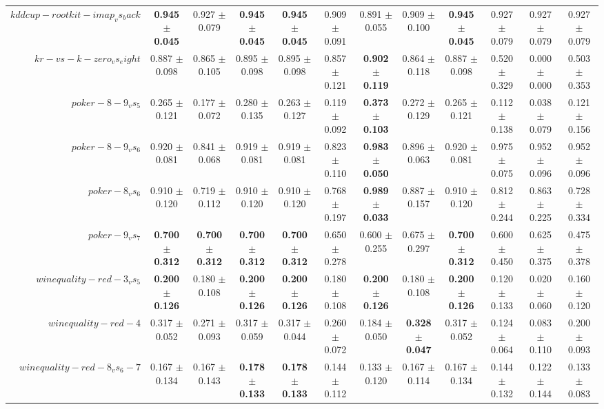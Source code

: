 \begin{table}[!ht]
{\begin{tabular}{r c c c c c c c c c c c}
$kddcup-rootkit-imap_vs_back$ & \textbf{0.945 $\pm$ 0.045} & 0.927 $\pm$ 0.079 & \textbf{0.945 $\pm$ 0.045} & \textbf{0.945 $\pm$ 0.045} & 0.909 $\pm$ 0.091 & 0.891 $\pm$ 0.055 & 0.909 $\pm$ 0.100 & \textbf{0.945 $\pm$ 0.045} & 0.927 $\pm$ 0.079 & 0.927 $\pm$ 0.079 & 0.927 $\pm$ 0.079 \\
$kr-vs-k-zero_vs_eight$ & 0.887 $\pm$ 0.098 & 0.865 $\pm$ 0.105 & 0.895 $\pm$ 0.098 & 0.895 $\pm$ 0.098 & 0.857 $\pm$ 0.121 & \textbf{0.902 $\pm$ 0.119} & 0.864 $\pm$ 0.118 & 0.887 $\pm$ 0.098 & 0.520 $\pm$ 0.329 & 0.000 $\pm$ 0.000 & 0.503 $\pm$ 0.353 \\
$poker-8-9_vs_5$ & 0.265 $\pm$ 0.121 & 0.177 $\pm$ 0.072 & 0.280 $\pm$ 0.135 & 0.263 $\pm$ 0.127 & 0.119 $\pm$ 0.092 & \textbf{0.373 $\pm$ 0.103} & 0.272 $\pm$ 0.129 & 0.265 $\pm$ 0.121 & 0.112 $\pm$ 0.138 & 0.038 $\pm$ 0.079 & 0.121 $\pm$ 0.156 \\
$poker-8-9_vs_6$ & 0.920 $\pm$ 0.081 & 0.841 $\pm$ 0.068 & 0.919 $\pm$ 0.081 & 0.919 $\pm$ 0.081 & 0.823 $\pm$ 0.110 & \textbf{0.983 $\pm$ 0.050} & 0.896 $\pm$ 0.063 & 0.920 $\pm$ 0.081 & 0.975 $\pm$ 0.075 & 0.952 $\pm$ 0.096 & 0.952 $\pm$ 0.096 \\
$poker-8_vs_6$ & 0.910 $\pm$ 0.120 & 0.719 $\pm$ 0.112 & 0.910 $\pm$ 0.120 & 0.910 $\pm$ 0.120 & 0.768 $\pm$ 0.197 & \textbf{0.989 $\pm$ 0.033} & 0.887 $\pm$ 0.157 & 0.910 $\pm$ 0.120 & 0.812 $\pm$ 0.244 & 0.863 $\pm$ 0.225 & 0.728 $\pm$ 0.334 \\
$poker-9_vs_7$ & \textbf{0.700 $\pm$ 0.312} & \textbf{0.700 $\pm$ 0.312} & \textbf{0.700 $\pm$ 0.312} & \textbf{0.700 $\pm$ 0.312} & 0.650 $\pm$ 0.278 & 0.600 $\pm$ 0.255 & 0.675 $\pm$ 0.297 & \textbf{0.700 $\pm$ 0.312} & 0.600 $\pm$ 0.450 & 0.625 $\pm$ 0.375 & 0.475 $\pm$ 0.378 \\
$winequality-red-3_vs_5$ & \textbf{0.200 $\pm$ 0.126} & 0.180 $\pm$ 0.108 & \textbf{0.200 $\pm$ 0.126} & \textbf{0.200 $\pm$ 0.126} & 0.180 $\pm$ 0.108 & \textbf{0.200 $\pm$ 0.126} & 0.180 $\pm$ 0.108 & \textbf{0.200 $\pm$ 0.126} & 0.120 $\pm$ 0.133 & 0.020 $\pm$ 0.060 & 0.160 $\pm$ 0.120 \\
$winequality-red-4$ & 0.317 $\pm$ 0.052 & 0.271 $\pm$ 0.093 & 0.317 $\pm$ 0.059 & 0.317 $\pm$ 0.044 & 0.260 $\pm$ 0.072 & 0.184 $\pm$ 0.050 & \textbf{0.328 $\pm$ 0.047} & 0.317 $\pm$ 0.052 & 0.124 $\pm$ 0.064 & 0.083 $\pm$ 0.110 & 0.200 $\pm$ 0.093 \\
$winequality-red-8_vs_6-7$ & 0.167 $\pm$ 0.134 & 0.167 $\pm$ 0.143 & \textbf{0.178 $\pm$ 0.133} & \textbf{0.178 $\pm$ 0.133} & 0.144 $\pm$ 0.112 & 0.133 $\pm$ 0.120 & 0.167 $\pm$ 0.114 & 0.167 $\pm$ 0.134 & 0.144 $\pm$ 0.132 & 0.122 $\pm$ 0.144 & 0.133 $\pm$ 0.083 \\

\end{tabular}}
\end{table}
